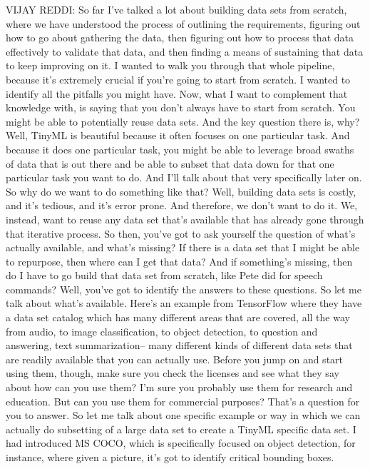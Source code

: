 VIJAY REDDI: So far I've talked a lot about building data sets from scratch,
where we have understood the process of outlining the requirements,
figuring out how to go about gathering the data,
then figuring out how to process that data effectively to validate that data,
and then finding a means of sustaining that data to keep improving on it.
I wanted to walk you through that whole pipeline,
because it's extremely crucial if you're going to start from scratch.
I wanted to identify all the pitfalls you might have.
Now, what I want to complement that knowledge with,
is saying that you don't always have to start from scratch.
You might be able to potentially reuse data sets.
And the key question there is, why?
Well, TinyML is beautiful because it often focuses on one particular task.
And because it does one particular task, you
might be able to leverage broad swaths of data that is out there
and be able to subset that data down for that one particular task
you want to do.
And I'll talk about that very specifically later on.
So why do we want to do something like that?
Well, building data sets is costly, and it's tedious, and it's error prone.
And therefore, we don't want to do it.
We, instead, want to reuse any data set that's available that has already
gone through that iterative process.
So then, you've got to ask yourself the question of what's actually available,
and what's missing?
If there is a data set that I might be able to repurpose,
then where can I get that data?
And if something's missing, then do I have
to go build that data set from scratch, like Pete did for speech commands?
Well, you've got to identify the answers to these questions.
So let me talk about what's available.
Here's an example from TensorFlow where they have a data set catalog which
has many different areas that are covered, all the way from audio,
to image classification, to object detection,
to question and answering, text summarization--
many different kinds of different data sets
that are readily available that you can actually use.
Before you jump on and start using them, though, make
sure you check the licenses and see what they say about how can you use them?
I'm sure you probably use them for research and education.
But can you use them for commercial purposes?
That's a question for you to answer.
So let me talk about one specific example or way in which
we can actually do subsetting of a large data set
to create a TinyML specific data set.
I had introduced MS COCO, which is specifically
focused on object detection, for instance, where given a picture,
it's got to identify critical bounding boxes.
